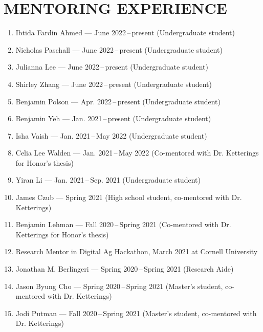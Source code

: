 \documentclass[11pt]{article}
\begin{document}
\section*{MENTORING EXPERIENCE}
\begin{enumerate} [itemsep=-1ex]
\item Ibtida Fardin Ahmed --- June 2022\,--\,present (Undergraduate student)
\item Nicholas Paschall --- June 2022\,--\,present (Undergraduate student)
\item Julianna Lee --- June 2022\,--\,present (Undergraduate student)
\item Shirley Zhang --- June 2022\,--\,present (Undergraduate student)
\item Benjamin Polson --- Apr. 2022\,--\,present (Undergraduate student)
\item Benjamin Yeh --- Jan. 2021\,--\,present (Undergraduate student)
\item Isha Vaish --- Jan. 2021\,--\,May 2022 (Undergraduate student)
\item Celia Lee Walden --- Jan. 2021\,--\,May 2022 (Co-mentored with Dr. Ketterings for Honor's thesis)
\item Yiran Li --- Jan. 2021\,--\,Sep. 2021 (Undergraduate student)
\newpage
\item James Czub --- Spring 2021 (High school student, co-mentored with Dr. Ketterings)
\item Benjamin Lehman --- Fall 2020\,--\,Spring 2021 (Co-mentored with Dr. Ketterings for Honor's thesis)
\item Research Mentor in Digital Ag Hackathon, March 2021 at Cornell University 
\item Jonathan M. Berlingeri --- Spring 2020\,--\,Spring 2021 (Research Aide)
\item Jason Byung Cho --- Spring 2020\,--\,Spring 2021 (Master's student, co-mentored with Dr. Ketterings)
\item Jodi Putman --- Fall 2020\,--\,Spring 2021 (Master's student, co-mentored with Dr. Ketterings)
\end{enumerate}


\end{document}
